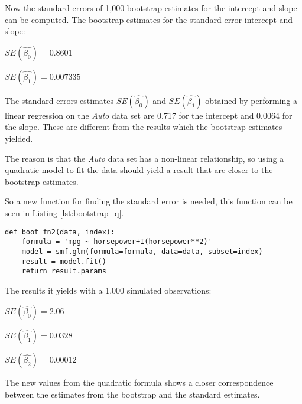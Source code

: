 Now the standard errors of 1,000 bootstrap estimates for the intercept and slope can be computed.
The bootstrap estimates for the standard error intercept and slope:

\begin{center}
	$SE(\hat{\beta_0}) = 0.8601$
\end{center} 
\begin{center}
	$SE(\hat{\beta_1}) = 0.007335$
\end{center}

The standard errors estimates $SE(\hat{\beta_0})$ and $SE(\hat{\beta_1})$ obtained by performing a linear regression on the \emph{Auto} data set are 0.717 for the intercept and 0.0064 for the slope. These are different from the results which the bootstrap estimates yielded.

The reason is that the \emph{Auto} data set has a non-linear relationship, so using a quadratic model to fit the data should yield a result that are closer to the bootstrap estimates.

So a new function for finding the standard error is needed, this function can be seen in Listing \ref{lst:bootstrap_q}.

\begin{lstlisting}[caption={Function to calculate standard error with a qudratic model}, label=lst:bootstrap_q, mathescape=true]
def boot_fn2(data, index):
	formula = 'mpg ~ horsepower+I(horsepower**2)'
	model = smf.glm(formula=formula, data=data, subset=index)
	result = model.fit()
	return result.params
\end{lstlisting}

The results it yields with a 1,000 simulated observations:

\begin{center}
	$SE(\hat{\beta_0}) = 2.06$
\end{center}
\begin{center}
	$SE(\hat{\beta_1}) = 0.0328$
\end{center}
\begin{center}
	$SE(\hat{\beta_2}) = 0.00012$
\end{center}

The new values from the quadratic formula shows a closer correspondence between the estimates from the bootstrap and the standard estimates.